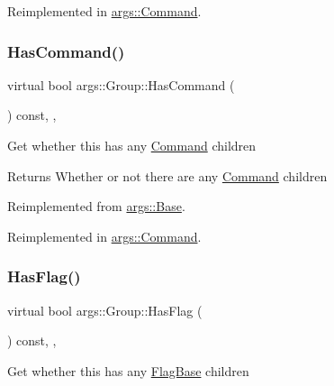 Reimplemented in \hyperlink{classargs_1_1_command_a37fbbde216ce232279e04edce12c1245}{args\+::\+Command}.

\mbox{\label{classargs_1_1_group_a022cbdf1f4bfe4210a56fa8ca9045bf8}} 
\subsubsection{\texorpdfstring{Has\+Command()}{HasCommand()}}
{\footnotesize\ttfamily virtual bool args\+::\+Group\+::\+Has\+Command (\begin{DoxyParamCaption}{ }\end{DoxyParamCaption}) const\hspace{0.3cm}{\ttfamily [inline]}, {\ttfamily [override]}, {\ttfamily [virtual]}}

Get whether this has any \hyperlink{classargs_1_1_command}{Command} children

\begin{DoxyReturn}{Returns}
Whether or not there are any \hyperlink{classargs_1_1_command}{Command} children 
\end{DoxyReturn}


Reimplemented from \hyperlink{classargs_1_1_base_a78322109f31edba4bb467d73e6663422}{args\+::\+Base}.



Reimplemented in \hyperlink{classargs_1_1_command_aa7117d38f553f127542434f6cafc2697}{args\+::\+Command}.

\mbox{\label{classargs_1_1_group_a67e35305748038c175dee92ad1f5290f}} 
\subsubsection{\texorpdfstring{Has\+Flag()}{HasFlag()}}
{\footnotesize\ttfamily virtual bool args\+::\+Group\+::\+Has\+Flag (\begin{DoxyParamCaption}{ }\end{DoxyParamCaption}) const\hspace{0.3cm}{\ttfamily [inline]}, {\ttfamily [override]}, {\ttfamily [virtual]}}

Get whether this has any \hyperlink{classargs_1_1_flag_base}{Flag\+Base} children

